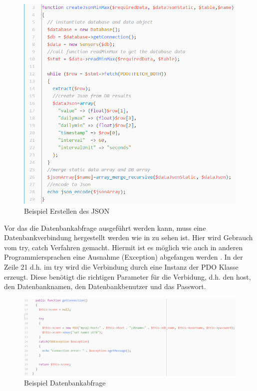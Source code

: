 \begin{figure}[h!]
	\centering
	\includegraphics[width=1\linewidth]{img/API_temperature_code_createJson}
	\caption{Beispiel Erstellen des JSON}
	\label{img:wetterstation}
\end{figure}

Vor das die Datenbankabfrage ausgeführt werden kann, muss eine Datenbankverbindung hergestellt werden wie in  zu sehen ist. Hier wird Gebrauch vom try, catch Verfahren gemacht. Hiermit ist es möglich wie auch in anderen Programmiersprachen eine Ausnahme (Exception) abgefangen werden \cite{Ausnahmebehandlung:ThePHPGroup}. In der Zeile 21 d.h. im try wird die Verbindung durch eine Instanz der PDO Klasse erzeugt. Diese benötigt die richtigen Parameter für die Verbidung, d.h. den host, den Datenbanknamen, den Datenbankbenutzer und das Passwort.

\begin{figure}[h!]
	\centering
	\includegraphics[width=1\linewidth]{img/API_temperature_code_database}
	\caption{Beispiel Datenbankabfrage}
	\label{img:wetterstation}
\end{figure}

